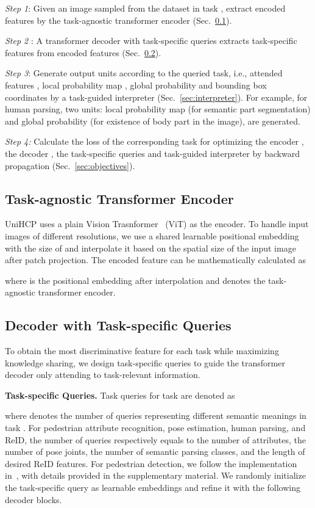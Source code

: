 \documentclass[10pt,twocolumn,letterpaper]{article}
\begin{document}
\emph{Step 1}: Given an image  sampled from the dataset in  task , extract encoded features  by the task-agnostic transformer encoder  (Sec.~\ref{sec:encoder}).

\emph{Step 2} : A transformer decoder  with task-specific queries  extracts task-specific features from encoded features  (Sec.~\ref{sec:decoder}). 

\emph{Step 3}: Generate output units according to the queried task, i.e., attended features , local probability map , global probability  and bounding box coordinates  by a task-guided interpreter  (Sec.~\ref{sec:interpreter}). For example, for human parsing, two units: local probability map  (for semantic part segmentation) and global probability  (for existence of body part in the image), are generated.

\emph{Step 4:} Calculate the loss of the corresponding task for optimizing the encoder , the decoder , the task-specific queries  and task-guided interpreter  by backward propagation (Sec.~\ref{sec:objectives}). 


\subsection{Task-agnostic Transformer Encoder} \label{sec:encoder}
UniHCP uses a plain Vision Trasnformer~\cite{dosovitskiy2020image} (ViT) as the encoder. To handle input images of different resolutions, we use a shared learnable positional embedding with the size of  and interpolate it based on the spatial size of the input image after patch projection. The encoded feature  can be mathematically calculated as

where  is the positional embedding after interpolation and  denotes the task-agnostic transformer encoder.

\subsection{Decoder with Task-specific Queries} \label{sec:decoder}
To obtain the most discriminative feature for each task while maximizing knowledge sharing, we design task-specific queries to guide the  transformer decoder only attending to task-relevant information. 


\noindent \textbf{Task-specific Queries.}
Task queries for task  are denoted as

where  denotes the number of queries representing  different semantic meanings in task . For pedestrian attribute recognition, pose estimation, human parsing, and ReID, the number of queries respectively equals to the number of  attributes, the number of pose joints, the number of semantic parsing classes, and the length of desired ReID features. For pedestrian detection, we follow the implementation in~\cite{wang2022anchor}, with details provided in the supplementary material. We randomly initialize the task-specific query  as learnable embeddings  and refine it with the following decoder blocks. 
\end{document}
